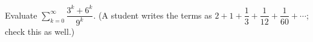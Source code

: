 Evaluate $\displaystyle\sum_{k=0}^{\infty}\dfrac{3^k+6^k}{9^k}$. (A student writes the terms as $2+1+\dfrac{1}{3}+\dfrac{1}{12}+\dfrac{1}{60}+\cdots$; check this as well.)
